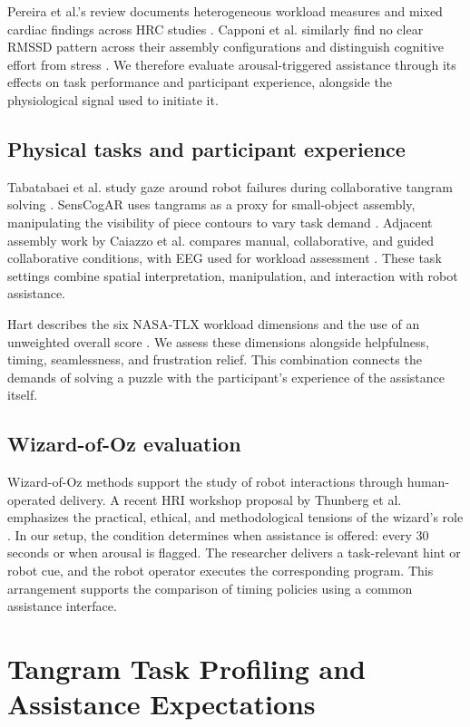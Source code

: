 \documentclass[sigconf,anonymous,balance=false]{aamas} %
\begin{document}
Pereira et al.'s review documents heterogeneous workload measures and mixed cardiac findings across HRC studies \cite{pereira2025}. Capponi et al. similarly find no clear RMSSD pattern across their assembly configurations and distinguish cognitive effort from stress \cite{capponi2024}. We therefore evaluate arousal-triggered assistance through its effects on task performance and participant experience, alongside the physiological signal used to initiate it.

\subsection{Physical tasks and participant experience}

Tabatabaei et al. study gaze around robot failures during collaborative tangram solving \cite{tabatabaei2025}. SensCogAR uses tangrams as a proxy for small-object assembly, manipulating the visibility of piece contours to vary task demand \cite{melo2026}. Adjacent assembly work by Caiazzo et al. compares manual, collaborative, and guided collaborative conditions, with EEG used for workload assessment \cite{caiazzo2024}. These task settings combine spatial interpretation, manipulation, and interaction with robot assistance.

Hart describes the six NASA-TLX workload dimensions and the use of an unweighted overall score \cite{hart2006}. We assess these dimensions alongside helpfulness, timing, seamlessness, and frustration relief. This combination connects the demands of solving a puzzle with the participant's experience of the assistance itself.

\subsection{Wizard-of-Oz evaluation}

Wizard-of-Oz methods support the study of robot interactions through human-operated delivery. A recent HRI workshop proposal by Thunberg et al. emphasizes the practical, ethical, and methodological tensions of the wizard's role \cite{thunberg2026}. In our setup, the condition determines when assistance is offered: every 30 seconds or when arousal is flagged. The researcher delivers a task-relevant hint or robot cue, and the robot operator executes the corresponding program. This arrangement supports the comparison of timing policies using a common assistance interface.

\section{Tangram Task Profiling and Assistance Expectations}
\end{document}
